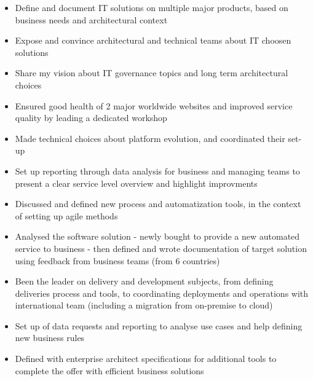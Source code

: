 \documentclass[11pt,a4paper,ragged2e]{src/altacv_1column}
\begin{document}

\begin{itemize}
\item Define and document IT solutions on multiple major products, based on business needs and architectural context
\item Expose and convince architectural and technical teams about IT choosen solutions
\item Share my vision about IT governance topics and long term architectural choices
\end{itemize}

\divider

\begin{itemize}
\item Ensured good health of 2 major worldwide websites and improved service quality by leading a dedicated workshop
\item Made technical choices about platform evolution, and coordinated their set-up
\item Set up reporting through data analysis for business and managing teams to present a clear service level overview and highlight improvments
\item Discussed and defined new process and automatization tools, in the context of setting up agile methods
\end{itemize}

\divider

\begin{itemize}
\item Analysed the software solution - newly bought to provide a new automated service to business - then defined and wrote documentation of target solution using feedback from business teams (from 6 countries)
\item Been the leader on delivery and development subjects, from defining deliveries process and tools, to coordinating deployments and operations with international team (including a migration from on-premise to cloud) 
\item Set up of data requests and reporting to analyse use cases and help defining new business rules
\item Defined with enterprise architect specifications for additional tools to complete the offer with efficient business solutions
\end{itemize}
\end{document}
